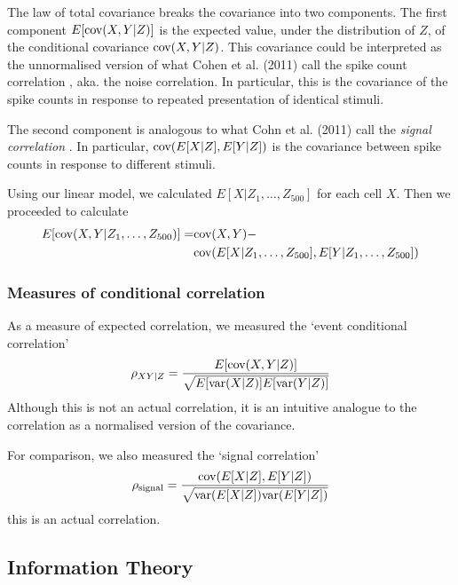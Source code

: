         The law of total covariance breaks the covariance into two components. The first component $E[\text{cov}(X,Y|Z)]$ is the expected value, under the distribution of $Z$, of the conditional covariance $\text{cov}(X,Y|Z)$. This covariance could be interpreted as the unnormalised version of what Cohen et al. (2011) call the spike count correlation \parencite{cohen2}, aka. the noise correlation. In particular, this is the covariance of the spike counts in response to repeated presentation of identical stimuli.

        The second component is analogous to what Cohn et al. (2011) call the \textit{signal correlation} \parencite{cohen2}. In particular, $\text{cov}(E[X|Z], E[Y|Z])$ is the covariance between spike counts in response to different stimuli.

        Using our linear model, we calculated $E[X|Z_1,\dots, Z_{500}]$ for each cell $X$. Then we proceeded to calculate
        \begin{align}
            E[\text{cov}(X,Y|Z_1,\dots, Z_{500})] = & \text{cov}(X,Y) - \\
              & \text{cov}(E[X|Z_1,\dots, Z_{500}], E[Y|Z_1,\dots, Z_{500}])
        \end{align}

        \subsubsection{Measures of conditional correlation}\label{sec:cond_corr}
        As a measure of expected correlation, we measured the `event conditional correlation'  \parencite{maugis}
        \begin{align}\label{eq:event_conditional_correlation}
            \rho_{XY|Z} = \frac{E[\text{cov}(X,Y|Z)]}{\sqrt{E[\text{var}(X|Z)]E[\text{var}(Y|Z)]}}
        \end{align}
        Although this is not an actual correlation, it is an intuitive analogue to the correlation as a normalised version of the covariance.

        For comparison, we also measured the `signal correlation'
        \begin{align}\label{eq:signal_correlation}
            \rho_{\text{signal}} = \frac{\text{cov}(E[X|Z], E[Y|Z])}{\sqrt{\text{var}(E[X|Z])\text{var}(E[Y|Z])}}
        \end{align}
        this is an actual correlation.

    \subsection{Information Theory}\label{sec:information_theory}
